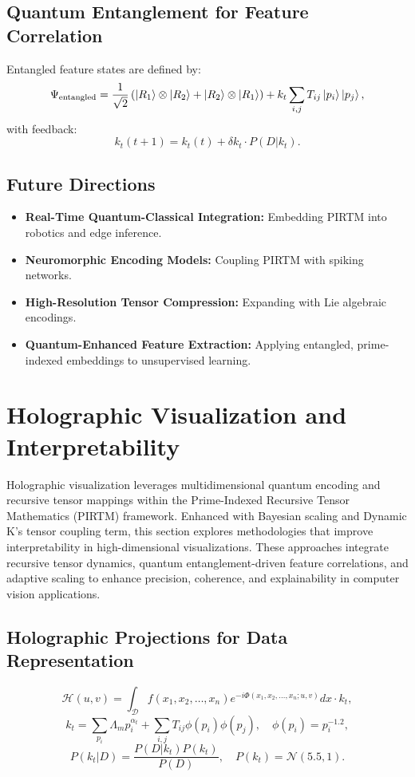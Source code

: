 \documentclass{article}
\theoremstyle{plain}
\begin{document}
\subsection{Quantum Entanglement for Feature Correlation}
Entangled feature states are defined by:
\begin{equation}
\Psi_\text{entangled} = \frac{1}{\sqrt{2}} \left(\ket{R_1} \otimes \ket{R_2} + \ket{R_2} \otimes \ket{R_1} \right) + k_t \sum_{i,j} T_{ij} \ket{p_i} \ket{p_j},
\end{equation}
with feedback:
\begin{equation}
k_t(t+1) = k_t(t) + \delta k_t \cdot P(D | k_t).
\end{equation}

\subsection{Future Directions}
\begin{itemize}
    \item \textbf{Real-Time Quantum-Classical Integration:} Embedding PIRTM into robotics and edge inference.
    \item \textbf{Neuromorphic Encoding Models:} Coupling PIRTM with spiking networks.
    \item \textbf{High-Resolution Tensor Compression:} Expanding with Lie algebraic encodings.
    \item \textbf{Quantum-Enhanced Feature Extraction:} Applying entangled, prime-indexed embeddings to unsupervised learning.
\end{itemize}
\section{Holographic Visualization and Interpretability}
Holographic visualization leverages multidimensional quantum encoding and recursive tensor mappings within the Prime-Indexed Recursive Tensor Mathematics (PIRTM) framework. Enhanced with Bayesian scaling and Dynamic K’s tensor coupling term, this section explores methodologies that improve interpretability in high-dimensional visualizations. These approaches integrate recursive tensor dynamics, quantum entanglement-driven feature correlations, and adaptive scaling to enhance precision, coherence, and explainability in computer vision applications.

\subsection{Holographic Projections for Data Representation}
\begin{equation}
\mathcal{H}(u, v) = \int_{\mathcal{D}} f(x_1, x_2, \ldots, x_n) e^{-i\Phi(x_1, x_2, \ldots, x_n; u, v)} dx \cdot k_t,
\end{equation}
\begin{equation}
k_t = \sum_{p_i} \Lambda_m p_i^{\alpha_t} + \sum_{i,j} T_{ij} \phi(p_i) \phi(p_j), \quad \phi(p_i) = p_i^{-1.2},
\end{equation}
\begin{equation}
P(k_t | D) = \frac{P(D | k_t) P(k_t)}{P(D)}, \quad P(k_t) = \mathcal{N}(5.5, 1).
\end{equation}
\end{document}
